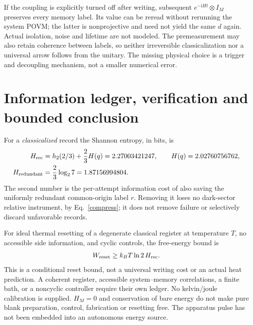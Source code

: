 \documentclass[11pt,a4paper]{article}
\newcommand{\ii}{\mathrm i}
\begin{document}
If the coupling is explicitly turned off after writing, subsequent
$e^{-\ii Ht}\otimes I_M$ preserves every memory label. Its value can
be reread without rerunning the system POVM; the latter is nonprojective
and need not yield the same $d$ again. Actual isolation, noise and
lifetime are not modeled. The premeasurement may also retain coherence
between labels, so neither irreversible classicalization nor a universal
arrow follows from the unitary. The missing physical choice is a
trigger and decoupling mechanism, not a smaller numerical error.

\newpage
\section{Information ledger, verification and bounded conclusion}
For a \emph{classicalized} record the Shannon entropy, in bits, is
\begin{align}
 H_{\rm rec}&=h_2(2/3)+\frac23H(q)
       =2.27003421247,\qquad H(q)=2.02760756762,\\
 H_{\rm redundant}&=\frac23\log_2 7=1.87156994804.
\end{align}
The second number is the per-attempt information cost of also saving
the uniformly redundant common-origin label $r$. Removing it loses no
dark-sector relative instrument, by Eq.~\eqref{compress}; it does not
remove failure or selectively discard unfavorable records.

For ideal thermal resetting of a degenerate classical register at
temperature $T$, no accessible side information, and cyclic controls,
the free-energy bound is~\cite{landauer}
\begin{equation}
 W_{\rm reset}\ge k_BT\ln2\,H_{\rm rec}.
\end{equation}
This is a conditional reset bound, not a universal writing cost or an
actual heat prediction. A coherent register, accessible system--memory
correlations, a finite bath, or a noncyclic controller require their own
ledger. No kelvin/joule calibration is supplied. $H_M=0$ and conservation
of bare energy do not make pure blank preparation, control, fabrication
or resetting free. The apparatus pulse has not been embedded into an
autonomous energy source.
\end{document}

